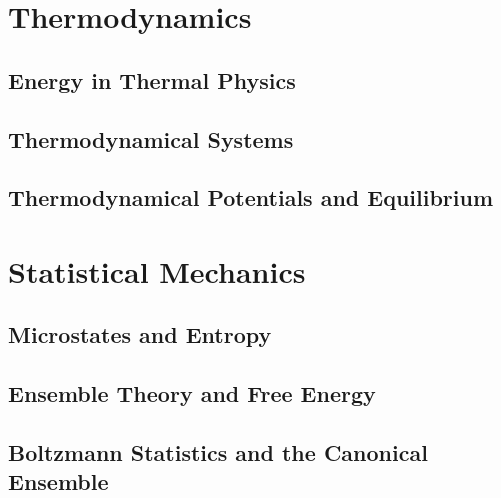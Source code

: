 \documentclass[12pt, a4paper, oneside, openright, titlepage]{book}
\begin{document}
\tableofcontents



\part{Thermodynamics}

\chapter{Energy in Thermal Physics}



\chapter{Thermodynamical Systems}



\chapter{Thermodynamical Potentials and Equilibrium}




\part{Statistical Mechanics}


\chapter{Microstates and Entropy}



\chapter{Ensemble Theory and Free Energy}



\chapter{Boltzmann Statistics and the Canonical Ensemble}
\end{document}
